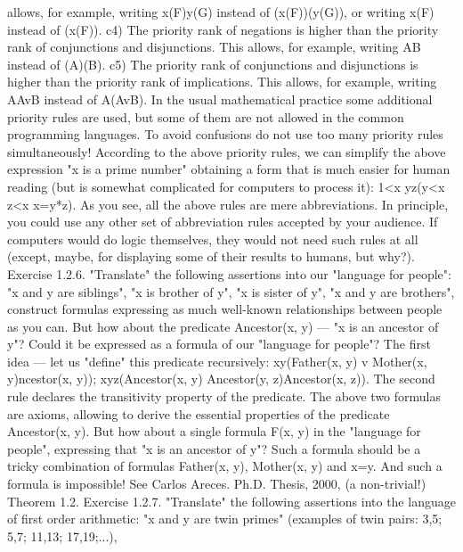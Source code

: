 allows, for example, writing \exists x(F)\AND \forall y(G) instead of (\exists x(F))\AND (\forall y(G)), or writing \neg \exists x(F) instead of
\neg (\exists x(F)).
c4) The priority rank of negations is higher than the priority rank of conjunctions and disjunctions. This
allows, for example, writing \neg A\AND \neg B instead of (\neg A)\AND (\neg B).
c5) The priority rank of conjunctions and disjunctions is higher than the priority rank of implications.
This allows, for example, writing A\IMPLIES AvB instead of A\IMPLIES (AvB).
In the usual mathematical practice some additional priority rules are used, but some of them are not
allowed in the common programming languages. To avoid confusions do not use too many priority rules
simultaneously!
According to the above priority rules, we can simplify the above expression "x is a prime number"
obtaining a form that is much easier for human reading (but is somewhat complicated for computers to
process it):
1<x \AND  \neg \exists y\exists z(y<x \AND  z<x \AND  x=y*z).
As you see, all the above rules are mere abbreviations. In principle, you could use any other set of
abbreviation rules accepted by your audience. If computers would do logic themselves, they would not
need such rules at all (except, maybe, for displaying some of their results to humans, but why?).
Exercise 1.2.6. "Translate" the following assertions into our "language for people":
"x and y are siblings",
"x is brother of y", "x is sister of y",
"x and y are brothers",
construct formulas expressing as much well-known relationships between people as you can.
But how about the predicate Ancestor(x, y) --- "x is an ancestor of y"? Could it be expressed as a formula
of our "language for people"? The first idea --- let us "define" this predicate recursively:
\forall x\forall y(Father(x, y) v Mother(x, y)\IMPLIES \forall ncestor(x, y));
\forall x\forall y\forall z(Ancestor(x, y) \AND  Ancestor(y, z)\IMPLIES Ancestor(x, z)).
The second rule declares the transitivity property of the predicate. The above two formulas are axioms,
allowing to derive the essential properties of the predicate Ancestor(x, y). But how about a single formula
F(x, y) in the "language for people", expressing that "x is an ancestor of y"? Such a formula should be a
tricky combination of formulas Father(x, y), Mother(x, y) and x=y. And such a formula is impossible! See
Carlos Areces. Ph.D. Thesis, 2000, (a non-trivial!) Theorem 1.2.
Exercise 1.2.7. "Translate" the following assertions into the language of first order arithmetic:
"x and y are twin primes" (examples of twin pairs: 3,5; 5,7; 11,13; 17,19;...),
